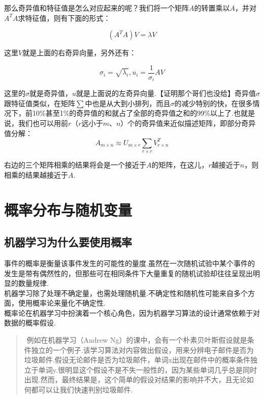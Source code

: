 那么奇异值和特征值是怎么对应起来的呢？我们将一个矩阵\(A\)的转置乘以\(A\)，并对\(A^TA​\)求特征值，则有下面的形式：

\[
(A^TA)V = \lambda V
\]

这里\(V​\)就是上面的右奇异向量，另外还有：

\[
\sigma_i = \sqrt{\lambda_i}, u_i=\frac{1}{\sigma_i}AV
\]

这里的\(\sigma​\)就是奇异值，\(u​\)就是上面说的左奇异向量.【证明那个哥们也没给】
​奇异值\(\sigma​\)跟特征值类似，在矩阵\(\sum​\)中也是从大到小排列，而且\(\sigma​\)的减少特别的快，在很多情况下，前10\%甚至1\%的奇异值的和就占了全部的奇异值之和的99\%以上了.也就是说，我们也可以用前\(r​\)（\(r​\)远小于\(m、n​\)）个的奇异值来近似描述矩阵，即部分奇异值分解：
\[
A_{m\times n}\approx U_{m \times r}\sum_{r\times r}V_{r \times n}^T
\]

右边的三个矩阵相乘的结果将会是一个接近于\(A\)的矩阵，在这儿，\(r\)越接近于\(n\)，则相乘的结果越接近于\(A\).

\section{概率分布与随机变量}\label{ux6982ux7387ux5206ux5e03ux4e0eux968fux673aux53d8ux91cf}

\subsection{机器学习为什么要使用概率}\label{ux673aux5668ux5b66ux4e60ux4e3aux4ec0ux4e48ux8981ux4f7fux7528ux6982ux7387}

事件的概率是衡量该事件发生的可能性的量度.虽然在一次随机试验中某个事件的发生是带有偶然性的，但那些可在相同条件下大量重复的随机试验却往往呈现出明显的数量规律.\\
​机器学习除了处理不确定量，也需处理随机量.不确定性和随机性可能来自多个方面，使用概率论来量化不确定性.\\
​概率论在机器学习中扮演着一个核心角色，因为机器学习算法的设计通常依赖于对数据的概率假设.

\begin{quote}
​ 例如在机器学习（Andrew
Ng）的课中，会有一个朴素贝叶斯假设就是条件独立的一个例子.该学习算法对内容做出假设，用来分辨电子邮件是否为垃圾邮件.假设无论邮件是否为垃圾邮件，单词x出现在邮件中的概率条件独立于单词y.很明显这个假设不是不失一般性的，因为某些单词几乎总是同时出现.然而，最终结果是，这个简单的假设对结果的影响并不大，且无论如何都可以让我们快速判别垃圾邮件.
\end{quote}

